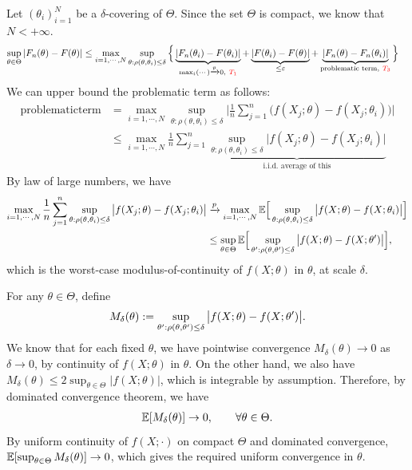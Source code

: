 \documentclass[11pt,letterpaper]{article}
\numberwithin{theorem}{lecture}
\numberwithin{proposition}{lecture}
\numberwithin{lemma}{lecture}
\numberwithin{claim}{lecture}
\numberwithin{corollary}{lecture}
\numberwithin{definition}{lecture}
\numberwithin{conjecture}{lecture}
\numberwithin{remark}{lecture}
\numberwithin{example}{lecture}
\numberwithin{equation}{lecture}
\begin{document}
Let $(\theta_i)_{i = 1}^N$ be a $\delta$-covering of $\Theta$. Since the set $\Theta$ is compact, we know that $N < +\infty$.
\begin{align*}
  \sup_{\theta \in \Theta} |F_n (\theta) - F (\theta)| &\leq \max_{i = 1, \cdots, N} \sup_{\theta: \rho (\theta, \theta_i) \leq \delta} \Big\{\underbrace{|F_n (\theta_i) - F (\theta_i)|}_{\max_{i} (\cdots) \xrightarrow{p} 0, ~{\color{red} T_1}} + \underbrace{|F (\theta_i) - F (\theta)|}_{\leq \varepsilon} + \underbrace{|F_n (\theta) - F_n (\theta_i)|}_{\text{problematic term},~ {\color{red} T_3}} \Big\}
\end{align*}
We can upper bound the problematic term as follows:
\begin{align*}
  \mathrm{problematic term} &=  \max_{i = 1, \cdots, N} \sup_{\theta: \rho (\theta, \theta_i) \leq \delta} \Big| \frac{1}{n} \sum_{j=1}^n \big( f (X_j; \theta) - f (X_j; \theta_i) \big) \Big |\\
  &\leq \max_{i = 1, \cdots, N}  \frac{1}{n} \sum_{j=1}^n  \underbrace{\sup_{\theta: \rho (\theta, \theta_i) \leq \delta} \big| f (X_j; \theta) - f (X_j; \theta_i) \big|}_{\text{i.i.d. average of this}}
\end{align*}
By law of large numbers, we have
\begin{align*}
  \max_{i = 1, \cdots, N}  \frac{1}{n} \sum_{j=1}^n  \sup_{\theta: \rho (\theta, \theta_i) \leq \delta} \big| f (X_j; \theta) - f (X_j; \theta_i) \big| &\xrightarrow{p} \max_{i = 1, \cdots, N} {\mathbb{E}} \Big[ \sup_{\theta: \rho (\theta, \theta_i) \leq \delta} \big| f (X; \theta) - f (X; \theta_i) \big| \Big]\\
  &\leq \sup_{\theta \in \Theta} {\mathbb{E}} \Big[ \sup_{\theta': \rho (\theta, \theta') \leq \delta} \big| f (X; \theta) - f (X; \theta') \big| \Big],
\end{align*}
which is the worst-case modulus-of-continuity of $f (X; \theta)$ in $\theta$, at scale $\delta$.

For any $\theta \in \Theta$, define
\begin{align*}
  M_\delta (\theta) := \sup_{\theta': \rho (\theta, \theta') \leq \delta} \big| f (X; \theta) - f (X; \theta') \big|.
\end{align*}
We know that for each fixed $\theta$, we have pointwise convergence $M_\delta (\theta) \to 0$ as $\delta \to 0$, by continuity of $f (X; \theta)$ in $\theta$. On the other hand, we also have $M_\delta (\theta) \leq 2 \sup_{\theta \in \Theta} |f (X; \theta)|$, which is integrable by assumption. Therefore, by dominated convergence theorem, we have
\begin{align*}
  {\mathbb{E}} [M_\delta (\theta)] \rightarrow 0, \qquad \forall \theta \in \Theta.
\end{align*}
By uniform continuity of $f(X;\cdot)$ on compact $\Theta$ and dominated convergence, ${\mathbb{E}}[\sup_{\theta\in\Theta}M_\delta(\theta)]\to0$, which gives the required uniform convergence in $\theta$.
\end{document}
